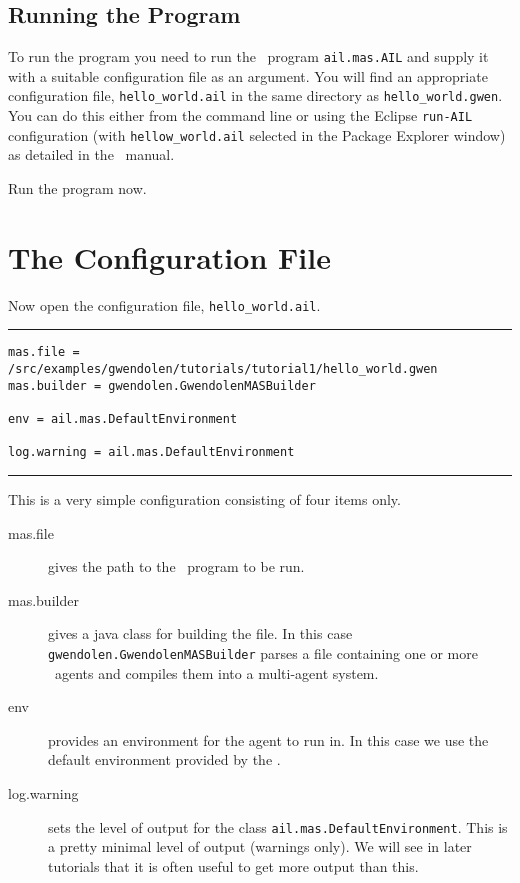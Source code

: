 \subsection{Running the Program}

To run the program you need to run the \java\ program \texttt{ail.mas.AIL} and supply it with a suitable configuration file as an argument.  You will find an appropriate configuration file, \texttt{hello\_world.ail} in the same directory as \texttt{hello\_world.gwen}.  You can do this either from the command line or using the Eclipse \texttt{run-AIL} configuration (with \texttt{hellow\_world.ail} selected in the Package Explorer window) as detailed in the \mcapl\ manual.

Run the program now.

\section{The Configuration File}
Now open the configuration file, \texttt{hello\_world.ail}.

\noindent\rule{\textwidth}{1pt}
\begin{verbatim}
mas.file = /src/examples/gwendolen/tutorials/tutorial1/hello_world.gwen
mas.builder = gwendolen.GwendolenMASBuilder

env = ail.mas.DefaultEnvironment

log.warning = ail.mas.DefaultEnvironment
\end{verbatim}
\rule{\textwidth}{1pt}

This is a very simple configuration consisting of four items only.
\begin{description}
\item[mas.file] gives the path to the \gwendolen\ program to be run.
\item[mas.builder] gives a java class for building the file.  In this case \texttt{gwendolen.GwendolenMASBuilder} parses a file containing one or more \gwendolen\ agents and compiles them into a multi-agent system.
\item[env] provides an environment for the agent to run in.  In this case we use the default environment provided by the \ail.
\item[log.warning] sets the level of output for the class \texttt{ail.mas.DefaultEnvironment}.  This is a pretty minimal level of output (warnings only).  We will see in later tutorials that it is often useful to get more output than this.
\end{description}

